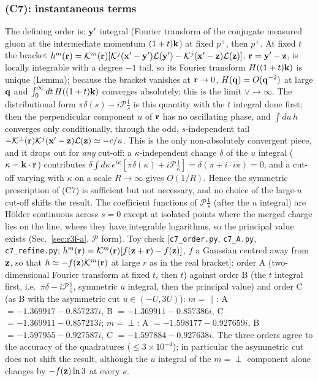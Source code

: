\subsubsection{(C7): instantaneous terms}\label{sec:r3f-C7}
\noindent The defining order is: $\mathbf{y}'$ integral (Fourier transform of the conjugate measured gluon at the intermediate momentum $(1+t)\mathbf{k}$) at fixed $p^+$, then $p^+$. At fixed $t$ the bracket $h^m(\mathbf{r})=\mathcal K^m(\mathbf{r})[\mathcal K^j(\mathbf{x}'-\mathbf{y}')\mathcal L(\mathbf{y}')-\mathcal K^j(\mathbf{x}'-\mathbf{z})\mathcal L(\mathbf{z})]$, $\mathbf{r}=\mathbf{y}'-\mathbf{z}$, is locally integrable with a degree $-1$ tail, so its Fourier transform $H((1+t)\mathbf{k})$ is unique (Lemma); because the bracket vanishes at $\mathbf{r}\to0$, $H(\mathbf{q})=O(\mathbf{q}^{-2})$ at large $\mathbf{q}$ and $\int_0^\infty dt\,H((1+t)\mathbf{k})$ converges absolutely; this is the limit $\vee\to\infty$. The distributional form $\pi\delta(s)-i\mathcal P\frac1s$ is this quantity with the $t$ integral done first; then the perpendicular component $u$ of $\mathbf{r}$ has no oscillating phase, and $\int du\,h$ converges only conditionally, through the odd, $s$-independent tail $-\mathcal K^\perp(\mathbf{r})\mathcal K^j(\mathbf{x}'-\mathbf{z})\mathcal L(\mathbf{z})\simeq-c/u$. This is the only non-absolutely convergent piece, and it drops out for \emph{any} cut-off: a $\kappa$-independent change $\delta$ of the $u$ integral ($\kappa=\mathbf{k}\cdot\mathbf{r}$) contributes $\delta\int d\kappa\,e^{i\kappa}[\pi\delta(\kappa)+i\mathcal P\frac1\kappa]=\delta(\pi+i\cdot i\pi)=0$, and a cut-off varying with $\kappa$ on a scale $R\to\infty$ gives $O(1/R)$. Hence the symmetric prescription of (C7) is sufficient but not necessary, and no choice of the large-$u$ cut-off shifts the result. The coefficient functions of $\mathcal P\frac1s$ (after the $u$ integral) are H\"older continuous across $s=0$ except at isolated points where the merged charge lies on the line, where they have integrable logarithms, so the principal value exists (Sec.~\ref{sec:r3f-a}, $\mathcal P$ form). Toy check [\texttt{c7\_order.py}, \texttt{c7\_A.py}, \texttt{c7\_refine.py}; $h^m(\mathbf{r})=\mathcal K^m(\mathbf{r})[f(\mathbf{z}+\mathbf{r})-f(\mathbf{z})]$, $f$ a Gaussian centred away from $\mathbf{z}$, so that $h\simeq-f(\mathbf{z})\mathcal K^m(\mathbf{r})$ at large $r$ as in the real bracket]: order A (two-dimensional Fourier transform at fixed $t$, then $t$) against order B (the $t$ integral first, i.e.\ $\pi\delta-i\mathcal P\frac1s$, symmetric $u$ integral, then the principal value) and order C (as B with the asymmetric cut $u\in(-U,3U)$): $m=\parallel$: A $=-1.369917-0.857237i$, B $=-1.369911-0.857386i$, C $=-1.369911-0.857213i$; $m=\perp$: A $=-1.598177-0.927659i$, B $=-1.597955-0.927587i$, C $=-1.597884-0.927638i$. The three orders agree to the accuracy of the quadratures ($\le3\times10^{-4}$); in particular the asymmetric cut does not shift the result, although the $u$ integral of the $m=\perp$ component alone changes by $-f(\mathbf{z})\ln3$ at every $\kappa$.

